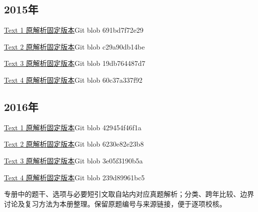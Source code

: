 \documentclass[11pt,a4paper]{article}
\begin{document}
\subsection{2015年}
\noindent \href{https://zj139.github.io/math-notes/english/bd84b09056a8e650262124b0/}{Text 1 原解析}\quad \href{https://github.com/ZJ139/math-notes/blob/3ccbda98a5fa9e6f3553cd7e90493f5e322b42bf/content/english/reading-answers/2015-reading-text-1.md}{固定版本}\quad Git blob 691bd7f72e29\par
\noindent \href{https://zj139.github.io/math-notes/english/1d136f1c0a2cc3e255b39ab4/}{Text 2 原解析}\quad \href{https://github.com/ZJ139/math-notes/blob/3ccbda98a5fa9e6f3553cd7e90493f5e322b42bf/content/english/reading-answers/2015-reading-text-2.md}{固定版本}\quad Git blob c29a90db14be\par
\noindent \href{https://zj139.github.io/math-notes/english/0830618620ce5f72f771a130/}{Text 3 原解析}\quad \href{https://github.com/ZJ139/math-notes/blob/3ccbda98a5fa9e6f3553cd7e90493f5e322b42bf/content/english/reading-answers/2015-reading-text-3.md}{固定版本}\quad Git blob 19db764487d7\par
\noindent \href{https://zj139.github.io/math-notes/english/cdca5e792ad64d07196bc0ec/}{Text 4 原解析}\quad \href{https://github.com/ZJ139/math-notes/blob/3ccbda98a5fa9e6f3553cd7e90493f5e322b42bf/content/english/reading-answers/2015-reading-text-4.md}{固定版本}\quad Git blob 60c37a337f92\par
{}
\subsection{2016年}
\noindent \href{https://zj139.github.io/math-notes/english/199237d5df9b8cc835b3f5e8/}{Text 1 原解析}\quad \href{https://github.com/ZJ139/math-notes/blob/3ccbda98a5fa9e6f3553cd7e90493f5e322b42bf/content/english/reading-answers/2016-reading-text-1.md}{固定版本}\quad Git blob 429454f46f1a\par
\noindent \href{https://zj139.github.io/math-notes/english/cace2d57f6e764744affd357/}{Text 2 原解析}\quad \href{https://github.com/ZJ139/math-notes/blob/3ccbda98a5fa9e6f3553cd7e90493f5e322b42bf/content/english/reading-answers/2016-reading-text-2.md}{固定版本}\quad Git blob 6230e82e23b8\par
\noindent \href{https://zj139.github.io/math-notes/english/b6f08ab4d489c8194307c00d/}{Text 3 原解析}\quad \href{https://github.com/ZJ139/math-notes/blob/3ccbda98a5fa9e6f3553cd7e90493f5e322b42bf/content/english/reading-answers/2016-reading-text-3.md}{固定版本}\quad Git blob 3e05f3190b5a\par
\noindent \href{https://zj139.github.io/math-notes/english/52a512b347cf9f366ac3f189/}{Text 4 原解析}\quad \href{https://github.com/ZJ139/math-notes/blob/3ccbda98a5fa9e6f3553cd7e90493f5e322b42bf/content/english/reading-answers/2016-reading-text-4.md}{固定版本}\quad Git blob 239d89961bc5\par
专册中的题干、选项与必要短引文取自站内对应真题解析；分类、跨年比较、边界讨论及复习方法为本册整理。保留原题编号与来源链接，便于逐项校核。\par
\end{document}
